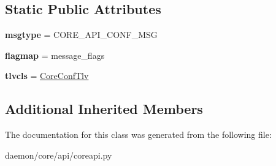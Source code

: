 \subsection*{Static Public Attributes}
\begin{DoxyCompactItemize}
\item 
\hypertarget{classcore_1_1api_1_1coreapi_1_1_core_conf_message_a46a8d1fac9ef18cfc1ddde7a992b70b7}{{\bfseries msgtype} = C\+O\+R\+E\+\_\+\+A\+P\+I\+\_\+\+C\+O\+N\+F\+\_\+\+M\+S\+G}\label{classcore_1_1api_1_1coreapi_1_1_core_conf_message_a46a8d1fac9ef18cfc1ddde7a992b70b7}

\item 
\hypertarget{classcore_1_1api_1_1coreapi_1_1_core_conf_message_ac8e885b9954d2d942eade13f3c671129}{{\bfseries flagmap} = message\+\_\+flags}\label{classcore_1_1api_1_1coreapi_1_1_core_conf_message_ac8e885b9954d2d942eade13f3c671129}

\item 
\hypertarget{classcore_1_1api_1_1coreapi_1_1_core_conf_message_a665523512a37546c3af2e2bd017f6dcc}{{\bfseries tlvcls} = \hyperlink{classcore_1_1api_1_1coreapi_1_1_core_conf_tlv}{Core\+Conf\+Tlv}}\label{classcore_1_1api_1_1coreapi_1_1_core_conf_message_a665523512a37546c3af2e2bd017f6dcc}

\end{DoxyCompactItemize}
\subsection*{Additional Inherited Members}


The documentation for this class was generated from the following file\+:\begin{DoxyCompactItemize}
\item 
daemon/core/api/coreapi.\+py\end{DoxyCompactItemize}
